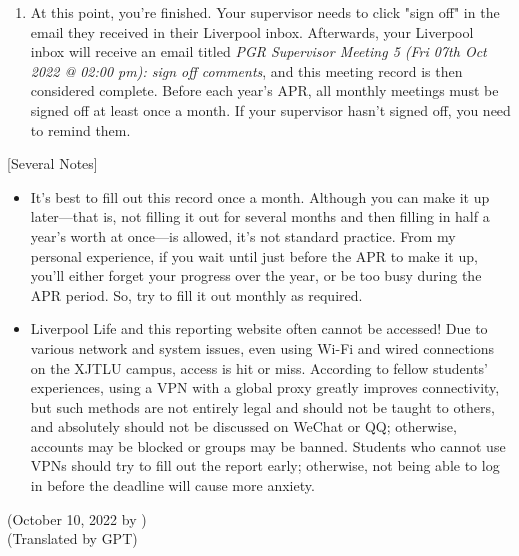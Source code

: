 \begin{enumerate}
    \item At this point, you're finished. Your supervisor needs to click "sign off" in the email they received in their Liverpool inbox. Afterwards, your Liverpool inbox will receive an email titled \textit{PGR Supervisor Meeting 5 (Fri 07th Oct 2022 @ 02:00 pm): sign off comments}, and this meeting record is then considered complete. Before each year's APR, all monthly meetings must be signed off at least once a month. If your supervisor hasn't signed off, you need to remind them.
\end{enumerate}

\vspace{5mm}
[Several Notes]
\begin{itemize}
    \item It's best to fill out this record once a month. Although you can make it up later—that is, not filling it out for several months and then filling in half a year's worth at once—is allowed, it's not standard practice. From my personal experience, if you wait until just before the APR to make it up, you'll either forget your progress over the year, or be too busy during the APR period. So, try to fill it out monthly as required.
    \item Liverpool Life and this reporting website often cannot be accessed! Due to various network and system issues, even using Wi-Fi and wired connections on the XJTLU campus, access is hit or miss. According to fellow students' experiences, using a VPN with a global proxy greatly improves connectivity, but such methods are not entirely legal and should not be taught to others, and absolutely should not be discussed on WeChat or QQ; otherwise, accounts may be blocked or groups may be banned. Students who cannot use VPNs should try to fill out the report early; otherwise, not being able to log in before the deadline will cause more anxiety.
\end{itemize}

\begin{flushright}
    (October 10, 2022 by \Wu) \\
    (Translated by GPT)
    \end{flushright}